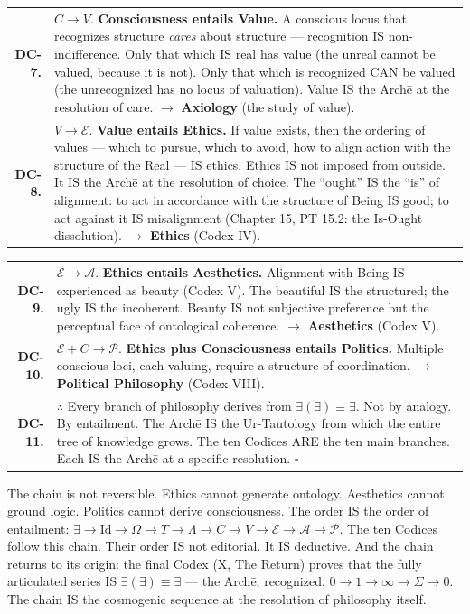 \documentclass[10pt, openany, oneside]{book}
\renewcommand{\footnotesize}{\fontsize{8.5}{11}\selectfont}
\begin{document}
{\begin{tabular}{r p{}}
\textbf{DC-7.} & $C \to V$. \textbf{Consciousness entails Value.} A conscious locus that recognizes structure \textit{cares} about structure --- recognition IS non-indifference. Only that which IS real has value (the unreal cannot be valued, because it is not). Only that which is recognized CAN be valued (the unrecognized has no locus of valuation). Value IS the Arch\={e} at the resolution of care. $\to$ \textbf{Axiology} (the study of value). \\[0.3em]
\textbf{DC-8.} & $V \to \mathcal{E}$. \textbf{Value entails Ethics.} If value exists, then the ordering of values --- which to pursue, which to avoid, how to align action with the structure of the Real --- IS ethics. Ethics IS not imposed from outside. It IS the Arch\={e} at the resolution of choice. The ``ought'' IS the ``is'' of alignment: to act in accordance with the structure of Being IS good; to act against it IS misalignment (Chapter 15, PT 15.2: the Is-Ought dissolution). $\to$ \textbf{Ethics} (Codex IV). \\[0.3em]
\end{tabular}
}

\pagebreak

{\footnotesize
\noindent\begin{tabular}{r p{}}
\textbf{DC-9.} & $\mathcal{E} \to \mathcal{A}$. \textbf{Ethics entails Aesthetics.} Alignment with Being IS experienced as beauty (Codex V). The beautiful IS the structured; the ugly IS the incoherent. Beauty IS not subjective preference but the perceptual face of ontological coherence. $\to$ \textbf{Aesthetics} (Codex V). \\[0.3em]
\textbf{DC-10.} & $\mathcal{E} + C \to \mathcal{P}$. \textbf{Ethics plus Consciousness entails Politics.} Multiple conscious loci, each valuing, require a structure of coordination. $\to$ \textbf{Political Philosophy} (Codex VIII). \\[0.3em]
\textbf{DC-11.} & $\therefore$ Every branch of philosophy derives from $\exists(\exists) \equiv \exists$. Not by analogy. By entailment. The Arch\={e} IS the Ur-Tautology from which the entire tree of knowledge grows. The ten Codices ARE the ten main branches. Each IS the Arch\={e} at a specific resolution. $\square$ \\[0.3em]
\end{tabular}
}

\vspace{0.8em}

\noindent The chain is not reversible. Ethics cannot generate ontology. Aesthetics cannot ground logic. Politics cannot derive consciousness. The order IS the order of entailment: $\exists \to \text{Id} \to \Omega \to T \to \Lambda \to C \to V \to \mathcal{E} \to \mathcal{A} \to \mathcal{P}$. The ten Codices follow this chain. Their order IS not editorial. It IS deductive. And the chain returns to its origin: the final Codex (X, The Return) proves that the fully articulated series IS $\exists(\exists) \equiv \exists$ --- the Arch\={e}, recognized. $0 \to 1 \to \infty \to \Sigma \to 0$. The chain IS the cosmogenic sequence at the resolution of philosophy itself.
\end{document}
